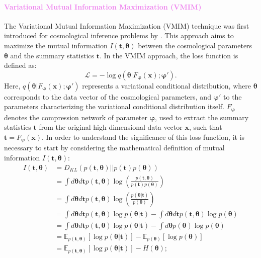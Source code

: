 \documentclass{aa}
\begin{document}
\paragraph{\textcolor{violet}{Variational Mutual Information Maximization (VMIM)}}
The Variational Mutual Information Maximization (VMIM) technique was first introduced for cosmological inference problems by \citet{jeffrey2021likelihood}. This approach aims to maximize the mutual information $I(\bm{t}, \bm {\theta})$ between the cosmological parameters $\bm{\theta}$ and the summary statistics $\bm{t}$.
In the VMIM approach, the loss function is defined as:
\begin{equation}\label{Eq:Loss_vmim}
    \mathcal{L}=- \log{q(\bm {\theta} |F_{\bm {\varphi}}(\bm {x}) ; \bm{\varphi}')}.
\end{equation}
Here, $q(\bm {\theta} |F_{\bm {\varphi}}(\bm {x});\bm{\varphi'})$ represents a variational conditional distribution, where $\bm{\theta}$ corresponds to the data vector of the cosmological parameters, and $\bm{\varphi'}$ to the parameters characterizing the variational conditional distribution itself. $F_{\bm {\varphi}}$ denotes the compression network of parameter $\bm {\varphi}$, used to extract the summary statistics $\bm{t}$ from the original high-dimensional data vector $\bm{x}$, such that  $\bm{t}=F_{\bm {\varphi}}(\bm{x})$.
In order to understand the significance of this loss function, it is necessary to start by considering the mathematical definition of mutual information $I(\bm{t}, \bm {\theta})$:
\begin{align}\label{Eq:mutual_information}
    I(\bm{t}, \bm {\theta}) &= D_{KL}(p(\bm {t}, \bm {\theta})||p(\bm {t})p(\bm {\theta})) \\ \nonumber
    &= \int d\bm{\theta} d\bm{t} p(\bm t, \bm \theta)\log{\left( \frac{ p(\bm {t}, \bm {\theta})}{ p(\bm {t}) p(\bm {\theta})} \right)} \\ \nonumber
    &= \int d\bm{\theta} d\bm{t} p(\bm t, \bm {\theta})\log{\left( \frac{ p(\bm {\theta} | \bm {t} )}{ p(\bm {\theta})} \right)} \\ \nonumber
        &= \int d\bm{\theta} d\bm{t} p(\bm t, \bm {\theta})\log{p(\bm {\theta} | \bm {t} )} - \int d\bm{\theta}  d\bm{t} p(\bm t, \bm {\theta})\log{p(\bm {\theta})} \\ \nonumber
    &= \int d\bm{\theta} d\bm{t} p(\bm t, \bm {\theta})\log{p(\bm {\theta} | \bm {t} )} - \int d\bm{\theta} p(\bm {\theta})\log{p(\bm {\theta})} \\ \nonumber
    &= \mathbb{E}_{p(\bm {t}, \bm {\theta})} [\log{p(\bm {\theta} | \bm {t} )}]- \mathbb{E}_{p(\bm {\theta})} [\log{p(\bm {\theta})}] \\ \nonumber
    &= \mathbb{E}_{p(\bm {t}, \bm {\theta})} [\log{p(\bm {\theta} | \bm {t} )}]- H(\bm {\theta});
\end{align}
\end{document}
